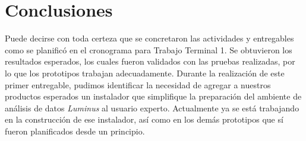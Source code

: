 \section{Conclusiones}
Puede decirse con toda certeza que se concretaron las actividades y entregables como se planificó en el cronograma para Trabajo Terminal 1. Se obtuvieron los resultados esperados, los cuales fueron validados con las pruebas realizadas, por lo que los prototipos trabajan adecuadamente. Durante la realización de este primer entregable, pudimos identificar la necesidad de agregar a nuestros productos esperados un instalador que simplifique la preparación del ambiente de análisis de datos \emph{Luminus} al usuario experto. Actualmente ya se está trabajando en la construcción de ese instalador, así como en los demás prototipos que sí fueron planificados desde un principio.\\